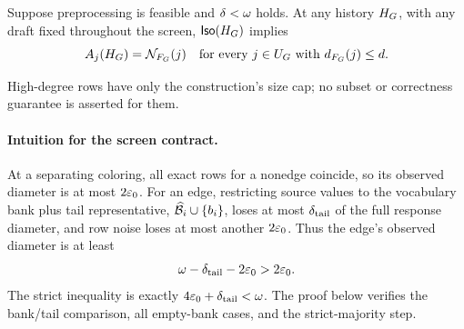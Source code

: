 \begin{lemma}
\label{app:lem:low-degree-screen}
\label{main:lem:low-degree-screen}
Suppose preprocessing is feasible and
$\delta<\omega$ holds. At any history $H_{G}$,
with any draft fixed throughout the screen, $\mathsf{Iso}(H_{G})$
implies
\begin{equation*}
 A_{j}(H_{G})=\mathcal N_{F_{G}}(j)
 \quad\text{for every }j\in U_{G}
 \text{ with }d_{F_{G}}(j)\le d.
\end{equation*}
\end{lemma}
High-degree rows have only the construction's size cap; no subset or
correctness guarantee is asserted for them.

\paragraph{Intuition for the screen contract.}
At a separating coloring, all exact rows for a nonedge coincide, so its
observed diameter is at most $2\varepsilon_0$.  For an edge, restricting source
values to the vocabulary bank plus tail representative,
$\widehat{\mathcal B}_{i}\cup\{b_{i}\}$, loses at most
$\delta_{\mathrm{tail}}$ of the full response
diameter, and row noise loses at most another $2\varepsilon_0$.  Thus the
edge's observed diameter is at least
\[
 \omega-\delta_{\mathrm{tail}}-2\varepsilon_0>2\varepsilon_0.
\]
The strict inequality is exactly
$4\varepsilon_0+\delta_{\mathrm{tail}}<\omega$.  The proof below verifies the
bank/tail comparison, all empty-bank cases, and the strict-majority step.

